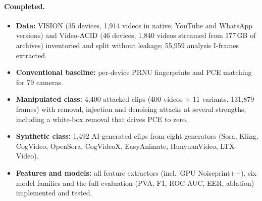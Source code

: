 \documentclass[11pt,a4paper]{article}
\begin{document}
\paragraph{Completed.}
\begin{itemize}
  \item \textbf{Data:} VISION (35 devices, 1{,}914 videos in native, YouTube and WhatsApp versions) and
        Video-ACID (46 devices, 1{,}840 videos streamed from 177\,GB of archives) inventoried and split
        without leakage; 55{,}959 analysis I-frames extracted.
  \item \textbf{Conventional baseline:} per-device PRNU fingerprints and PCE matching for 79 cameras.
  \item \textbf{Manipulated class:} 4{,}400 attacked clips (400 videos $\times$ 11 variants,
        131{,}879 frames) with removal, injection and denoising attacks at several strengths,
        including a white-box removal that drives PCE to zero.
  \item \textbf{Synthetic class:} 1{,}492 AI-generated clips from eight generators (Sora, Kling,
        CogVideo, OpenSora, CogVideoX, EasyAnimate, HunyuanVideo, LTX-Video).
  \item \textbf{Features and models:} all feature extractors (incl.\ GPU Noiseprint++), six model
        families and the full evaluation (PVA, F1, ROC-AUC, EER, ablation) implemented and tested.
\end{itemize}
\end{document}
